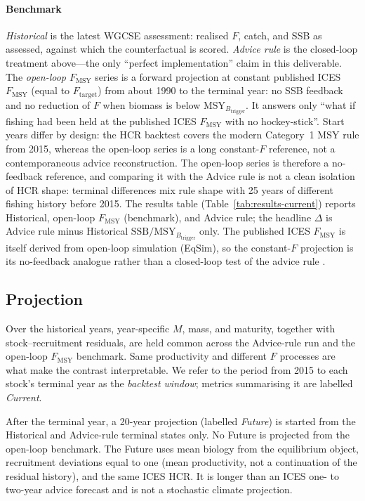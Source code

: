 \documentclass[11pt,a4paper]{article}
\newcommand{\Fmsy}{F_{\mathrm{MSY}}}
\newcommand{\Btrig}{\mathrm{MSY}_{B_{\mathrm{trigger}}}}
\newcommand{\Ftar}{F_{\mathrm{target}}}
\begin{document}
\paragraph{Benchmark}
\emph{Historical} is the latest WGCSE assessment: realised $F$, catch,
and SSB as assessed, against which the counterfactual is scored.
\emph{Advice rule} is the closed-loop treatment above---the only
``perfect implementation'' claim in this deliverable. The
\emph{open-loop $\Fmsy$} series is a forward projection at constant
published ICES $F_{\mathrm{MSY}}$ (equal to $\Ftar$) from about 1990 to
the terminal year: no SSB feedback and no reduction of $F$ when biomass
is below $\Btrig$. It answers only ``what if fishing had been held at
the published ICES $F_{\mathrm{MSY}}$ with no hockey-stick''. Start years
differ by design: the HCR backtest covers the modern Category~1 MSY rule
from 2015, whereas the open-loop series is a long constant-$F$
reference, not a contemporaneous advice reconstruction. The open-loop
series is therefore a no-feedback reference, and comparing it with the
Advice rule is not a clean isolation of HCR shape: terminal differences
mix rule shape with 25 years of different fishing history before 2015.
The results table (Table~\ref{tab:results-current}) reports Historical,
open-loop $\Fmsy$ (benchmark), and Advice rule; the headline $\Delta$ is
Advice rule minus Historical $\mathrm{SSB}/\Btrig$ only. The published
ICES $F_{\mathrm{MSY}}$ is itself derived from open-loop simulation
(EqSim), so the constant-$F$ projection is its no-feedback analogue
rather than a closed-loop test of the advice rule
\citep{winker2025precautionary}.

\subsection{Projection}
Over the historical years, year-specific $M$, mass, and maturity,
together with stock--recruitment residuals, are held common across the
Advice-rule run and the open-loop $\Fmsy$ benchmark. Same productivity
and different $F$ processes are what make the contrast interpretable. We
refer to the period from 2015 to each stock's terminal year as the
\emph{backtest window}; metrics summarising it are labelled
\emph{Current}.

After the terminal year, a 20-year projection (labelled \emph{Future}) is
started from the Historical and Advice-rule terminal states only. No
Future is projected from the open-loop benchmark. The Future uses mean
biology from the equilibrium object, recruitment deviations equal to one
(mean productivity, not a continuation of the residual history), and the
same ICES HCR. It is longer than an ICES one- to two-year advice forecast
and is not a stochastic climate projection.
\end{document}
